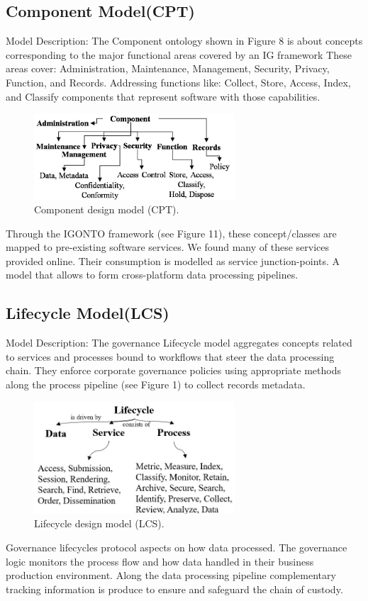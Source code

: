 \documentclass[a4paper,twoside]{article}
\begin{document}
\subsection{Component Model(CPT)}
Model Description: The Component ontology shown in Figure 8 is about concepts corresponding to the major functional areas covered by an IG framework These areas cover: Administration, Maintenance, Management, Security, Privacy, Function, and Records. Addressing functions like: Collect, Store, Access, Index, and Classify components that represent software with those capabilities. 
%
\begin{figure}[ht]
  \centering
    \includegraphics[width=7.5cm]{images/Fig8-IG.CPT.Model.png}
    \caption{Component design model (CPT).}
  \label{fig:cptmod}
\end{figure}
%
Through the IGONTO framework (see Figure 11), these concept/classes are mapped to pre-existing software services. We found many of these services provided online. Their consumption is modelled as service junction-points. A model that allows to form cross-platform data processing pipelines.
\subsection{Lifecycle Model(LCS)}
 Model Description: The governance Lifecycle model aggregates concepts related to services and processes bound to workflows that steer the data processing chain. They enforce corporate governance policies using appropriate methods along the process pipeline (see Figure 1) to collect records metadata.
%
\begin{figure}[ht]
  \centering
    \includegraphics[width=7.5cm]{images/Fig9-IG.Lcs.Model.png}
    \caption{Lifecycle design model (LCS).}
  \label{fig:lcsmod}
\end{figure}
Governance lifecycles protocol aspects on how data processed. The governance logic monitors the process flow and how data handled in their business production environment. Along the data processing pipeline complementary tracking information is produce to ensure and safeguard the chain of custody.
%
\end{document}
